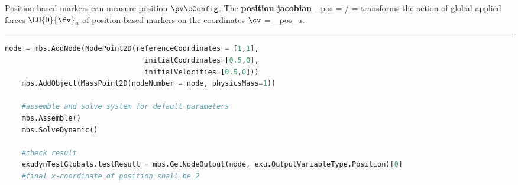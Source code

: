     Position-based markers can measure position $\pv\cConfig$. The {\bf position jacobian}  
    \be
      \Jm_{pos} = \partial \pv\cCur / \partial \cv\cCur = 
    \ee
    transforms the action of global applied forces $\LU{0}{\fv}_a$ of position-based markers on the coordinates $\cv$
    \be
      \Qm = \Jm_{pos}\tp {}_a.
    \ee
\vspace{6pt}\par\noindent\rule{\textwidth}{0.4pt}
\label{miniExample_ObjectMassPoint2D}
\pythonstyle
\begin{lstlisting}[language=Python, firstnumber=1]
    node = mbs.AddNode(NodePoint2D(referenceCoordinates = [1,1], 
                                 initialCoordinates=[0.5,0],
                                 initialVelocities=[0.5,0]))
    mbs.AddObject(MassPoint2D(nodeNumber = node, physicsMass=1))

    #assemble and solve system for default parameters
    mbs.Assemble()
    mbs.SolveDynamic()

    #check result
    exudynTestGlobals.testResult = mbs.GetNodeOutput(node, exu.OutputVariableType.Position)[0]
    #final x-coordinate of position shall be 2
\end{lstlisting}

